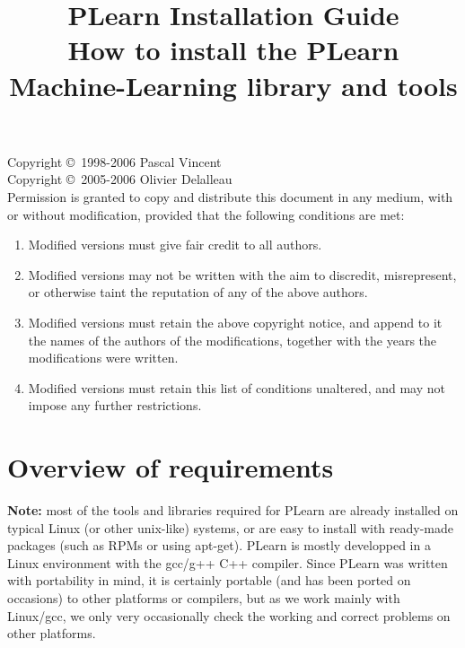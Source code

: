 \documentclass[11pt]{book}
\title{{\Huge PLearn Installation Guide\\ \Large How to install the PLearn Machine-Learning library and tools}}
\begin{document}

\maketitle

\vspace*{8cm}

Copyright \copyright\ 1998-2006 Pascal Vincent \\
Copyright \copyright\ 2005-2006 Olivier Delalleau \\

Permission is granted to copy and distribute this document in any medium,
with or without modification, provided that the following conditions are
met:

\begin{enumerate}
\item Modified versions must give fair credit to all authors.
\item Modified versions may not be written with the aim to discredit, misrepresent, or otherwise taint the
      reputation of any of the above authors.
\item Modified versions must retain the above copyright notice, and append to
   it the names of the authors of the modifications, together with the years the
   modifications were written.
\item Modified versions must retain this list of conditions unaltered, 
    and may not impose any further restrictions.
\end{enumerate}

\tableofcontents




\chapter{Overview of requirements}
\label{chap:label}

{\bf Note:} most of the tools and libraries required for PLearn are already
installed on typical Linux (or other unix-like) systems, or are easy to
install with ready-made packages (such as RPMs or using apt-get). PLearn is mostly
developped in a Linux environment with the gcc/g++ C++ compiler.  Since
PLearn was written with portability in mind, it is certainly
portable (and has been ported on occasions) to other platforms or
compilers, but as we work mainly with Linux/gcc, we only very occasionally
check the working and correct problems on other platforms.
\end{document}
